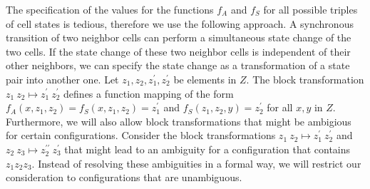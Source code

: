 \documentclass[pre,amssymb,showpacs,showkeys,preprint]{revtex4}
\begin{document}
The specification of the values for the functions $f_A$ and $f_S$ for all possible triples of
cell states is tedious, therefore we use the following approach.
A synchronous transition of two neighbor cells can perform a simultaneous state change of the two cells.
If the state change of these two neighbor cells is independent of their other neighbors,
we can specify the state change as a transformation of a state pair into another one.
Let $z_1, z_2, z_1^\prime, z_2^\prime$ be elements in $Z$.
The block transformation $z_1 \: z_2 \mapsto z_1^\prime \: z_2^\prime$ defines
 a function mapping of the form
$
f_A(x, z_1, z_2) = f_S(x, z_1, z_2) = z_1^\prime
$
and
$
f_S(z_1, z_2,y) = z_2^\prime
$
for all $x, y$ in $Z$.
Furthermore, we will also allow block transformations that might be ambigious for certain configurations.
Consider the block transformations
$z_1 \: z_2 \mapsto z_1^\prime \: z_2^\prime$
and
$z_2 \: z_3 \mapsto z_2^{\prime\prime} \: z_3^\prime$
that might lead to an ambiguity for a configuration that contains $z_1z_2z_3$.
Instead of resolving these ambiguities in a formal way, we will restrict our consideration to
configurations that are unambiguous.
\end{document}

